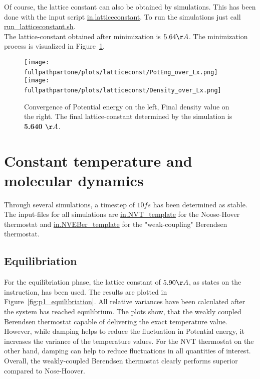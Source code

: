 \documentclass[10pt,a4paper]{report}
\def \pathpartone {../../1_three-dimensional_atomic_system}
\def \fullpathpartone {/home/lukas/Desktop/project/independence/atomistic_modeling/exam/1_three-dimensional_atomic_system}
\begin{document}
Of course, the lattice constant can also be obtained by simulations. This has been done with the input script \href{../../DIR1/in.latticeconstant}{in.latticeconstant}. To run the simulations just call \href{../../DIR1/run_latticeconstant.sh}{run\_latticeconstant.sh}.\\
The lattice-constant obtained after minimization is $5.64 \AA$. The minimization process is visualized in Figure~\ref{fig:p1_latticeconst}.

\begin{center}
\begin{figure}[h]
\texttt{[image: \\fullpathpartone/plots/latticeconst/PotEng\_over\_Lx.png]}~
\texttt{[image: \\fullpathpartone/plots/latticeconst/Density\_over\_Lx.png]}~
\caption[aa]{Convergence of Potential energy on the left, Final density value on the right. The final lattice-constant determined by the simulation is \textbf{5.640 $\AA$}. }
\label{fig:p1_latticeconst}
\end{figure}
\end{center}


\section{Constant temperature and molecular dynamics}
Through several simulations, a timestep of $10 fs$ has been determined as stable. The input-files for all simulations are \href{\pathpartone/in.NVT_template}{in.NVT\_template} for the Noose-Hover thermostat and \href{\pathpartone/in.NVEBer_template}{in.NVEBer\_template} for the "weak-coupling" Berendsen thermostat.

\subsection{Equilibriation}
For the equilibriation phase, the lattice constant of $5.90 \AA$, as states on the instruction, has been used. The results are plotted in Figure~\ref{fig:p1_equilibriation}. All relative variances have been calculated after the system has reached equilibrium. The plots show, that the weakly coupled Berendsen thermostat capable of delivering the exact temperature value. However, while damping helps to reduce the fluctuation in Potential energy, it increases the variance of the temperature values. For the NVT thermostat on the other hand, damping can help to reduce fluctuations in all quantities of interest.\\
Overall, the weakly-coupled Berendsen thermostat clearly performs superior compared to Nose-Hoover.
\end{document}
